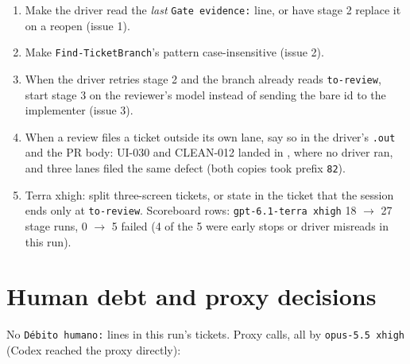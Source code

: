 \documentclass[11pt,a4paper]{article}
\begin{document}
\begin{enumerate}
  \item Make the driver read the \emph{last} \texttt{Gate evidence:} line, or have stage 2 replace
        it on a reopen (issue 1).
  \item Make \texttt{Find-TicketBranch}'s pattern case-insensitive (issue 2).
  \item When the driver retries stage 2 and the branch already reads \texttt{to-review}, start
        stage 3 on the reviewer's model instead of sending the bare id to the implementer
        (issue 3).
  \item When a review files a ticket outside its own lane, say so in the driver's \texttt{.out}
        and the PR body: UI-030 and CLEAN-012 landed in , where no
        driver ran, and three lanes filed the same defect (both copies took prefix \texttt{82}).
  \item Terra xhigh: split three-screen tickets, or state in the ticket that the session ends only
        at \texttt{to-review}. Scoreboard rows: \texttt{gpt-6.1-terra xhigh} 18 $\to$ 27 stage
        runs, 0 $\to$ 5 failed (4 of the 5 were early stops or driver misreads in this run).
\end{enumerate}

\section*{Human debt and proxy decisions}

No \texttt{Débito humano:} lines in this run's tickets. Proxy calls, all by
\texttt{opus-5.5 xhigh} (Codex reached the proxy directly):
\end{document}
